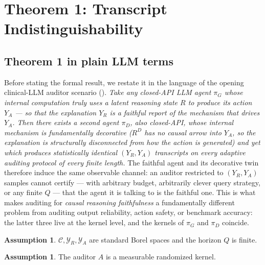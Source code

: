\documentclass{article}
\theoremstyle{plain}
\theoremstyle{definition}
\newtheorem{assumption}[theorem]{Assumption}
\theoremstyle{remark}
\newcommand{\C}{\mathcal{C}}
\newcommand{\YR}{\mathcal{Y}_R}
\newcommand{\YA}{\mathcal{Y}_A}
\begin{document}
\section{Theorem 1: Transcript Indistinguishability}\label{sec:thm-1}

\subsection{Theorem 1 in plain LLM terms}\label{sec:thm-1-intuition}

Before stating the formal result, we restate it in the language of the
opening clinical-LLM auditor scenario (). \emph{Take any
closed-API LLM agent $\pi_G$ whose internal computation truly uses a latent
reasoning state $R$ to produce its action $Y_A$ --- so that the explanation
$Y_R$ is a faithful report of the mechanism that drives $Y_A$. Then there
exists a second agent $\pi_D$, also closed-API, whose internal mechanism is
fundamentally decorative ($R^D$ has no causal arrow into $Y_A$, so the
explanation is structurally disconnected from how the action is generated)
and yet which produces statistically identical $(Y_R, Y_A)$ transcripts on
every adaptive auditing protocol of every finite length.} The faithful agent
and its decorative twin therefore induce the same observable channel: an
auditor restricted to $(Y_R, Y_A)$ samples cannot certify --- with arbitrary
budget, arbitrarily clever query strategy, or any finite $Q$ --- that
the agent it is talking to is the faithful one. This is what makes
auditing for \emph{causal reasoning faithfulness} a fundamentally different
problem from auditing output reliability, action safety, or benchmark
accuracy: the latter three live at the kernel level, and the kernels of
$\pi_G$ and $\pi_D$ coincide.

\begin{assumption}\label{ass:standard-borel}
$\C, \YR, \YA$ are standard Borel spaces and the horizon $Q$ is finite.
\end{assumption}

\begin{assumption}\label{ass:auditor}
The auditor $A$ is a measurable randomized kernel.
\end{assumption}
\end{document}
